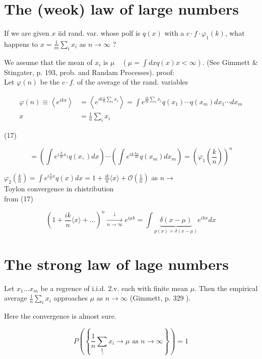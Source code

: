 \documentclass[10pt]{article}
\begin{document}
\section*{The (weok) law of large numbers}
If we are given $x$ iid rand. var. whose polf is $q(x)$ with a $c \cdot f \cdot \varphi_{1}(k)$, what happens to $x=\frac{1}{m} \sum_{i} x_{i}$ as $n \rightarrow \infty$ ?

We assume that the mean of $x_{i}$ is $\mu \quad\left(\mu=\int d x q(x) x<\infty\right)$. (See Gimmett \& Stingater, p. 193, prob. and Randam Processes). proof:\\
Let $\varphi(n)$ be the $c \cdot f$. of the average of the rand. variables

$$
\begin{aligned}
\varphi(n) \equiv\left\langle e^{i k x}\right\rangle & =\left\langle e^{i k \frac{1}{n} \sum_{i} x_{i}}\right\rangle=\int e^{\frac{i k}{m} \sum_{i} x_{i}} q\left(x_{1}\right) \cdots q\left(x_{m}\right) d x_{1} \cdots d x_{m} \\
x & =\frac{1}{n} \sum_{i} x_{i}
\end{aligned}
$$

(17)

$$
=\left(\int e^{i \frac{k}{m} x_{1}} q(x,) d x\right) \cdots\left(\int e^{i k \frac{x_{m}}{m}} q\left(x_{m}\right) d x_{m}\right)=\left(\varphi_{1}\left(\frac{k}{n}\right)\right)^{n}
$$

$\varphi_{2}\left(\frac{k}{n}\right)=\int e^{i \frac{k}{n} x} q(x) d x=1+\frac{i k}{n}\langle x\rangle+\mathcal{O}\left(\frac{1}{n}\right)$ as $n \rightarrow$\\
Toylon convergence in chistribution\\
from (17)

$$
\left(1+\frac{i k}{n}\langle x\rangle+\ldots\right)^{n} \xrightarrow[n \rightarrow \infty]{\downarrow} e^{i \mu k}=\int \underbrace{\delta(x-\mu)}_{p(x)=\delta(x-\mu)} e^{i k x} d x
$$

\section*{The strong law of lage numbers}
Let $x_{1} \ldots x_{m}$ be a regrence of i.i.d. 2.v. each with finite mean $\mu$. Then the empirical average $\frac{1}{n} \sum_{i} x_{i}$ approaches $\mu$ as $n \rightarrow \infty$ (Gimmett, p. 329 ).

Here the convergence is almost sure.

$$
P\left(\left\{\underline{\underline{\frac{1}{n} \sum_{1} x_{i}}} \rightarrow \mu \text { as } n \rightarrow \infty\right\}\right)=1
$$
\end{document}
